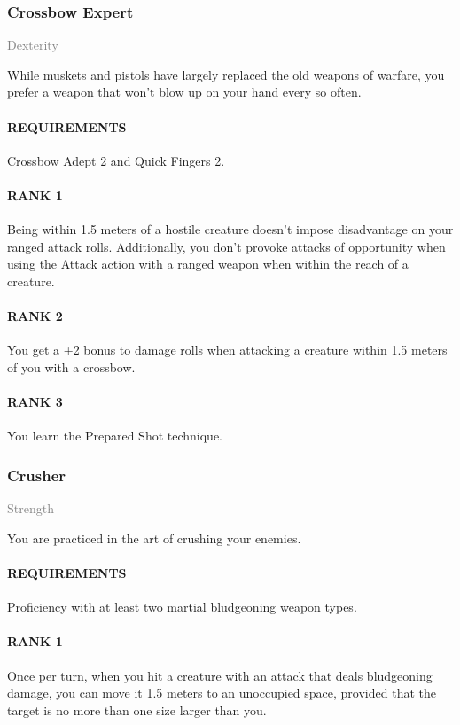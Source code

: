 \subsubsection{Crossbow Expert} \label{tal::crossbowexpert}
\small{\textcolor{gray}{Dexterity}}

\normalsize
While muskets and pistols have largely replaced the old weapons of warfare, you prefer a weapon that won't blow up on your hand every so often.
\paragraph{REQUIREMENTS} Crossbow Adept 2 and Quick Fingers 2.
\paragraph{RANK 1} Being within 1.5 meters of a hostile creature doesn't impose disadvantage on your ranged attack rolls.
Additionally, you don't provoke attacks of opportunity when using the Attack action with a ranged weapon when within the reach of a creature.
\paragraph{RANK 2} You get a +2 bonus to damage rolls when attacking a creature within 1.5 meters of you with a crossbow.
\paragraph{RANK 3} You learn the Prepared Shot technique.

\subsubsection{Crusher} \label{tal::crusher}
\small{\textcolor{gray}{Strength}}

\normalsize
You are practiced in the art of crushing your enemies.
\paragraph{REQUIREMENTS} Proficiency with at least two martial bludgeoning weapon types.
\paragraph{RANK 1} Once per turn, when you hit a creature with an attack that deals bludgeoning damage, you can move it 1.5 meters to an unoccupied space, provided that the target is no more than one size larger than you.
